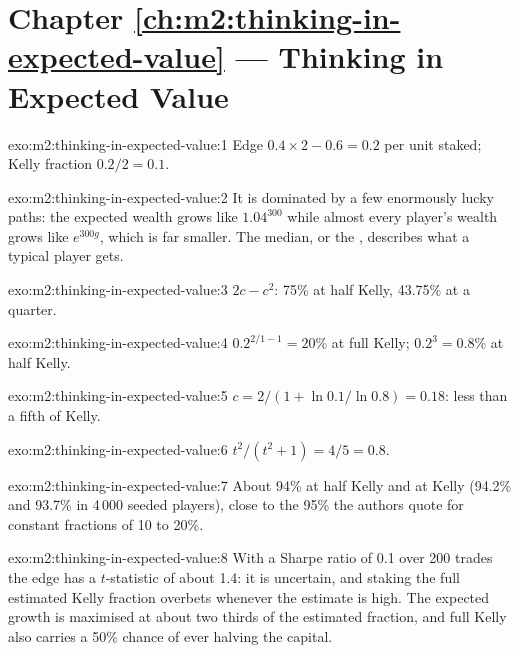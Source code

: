 \section*{Chapter \ref{ch:m2:thinking-in-expected-value} --- Thinking in Expected Value}

\begin{solution}{exo:m2:thinking-in-expected-value:1}
Edge $0.4 \times 2 - 0.6 = 0.2$ per unit staked; Kelly fraction $0.2/2 = 0.1$.
\end{solution}

\begin{solution}{exo:m2:thinking-in-expected-value:2}
It is dominated by a few enormously lucky paths: the expected wealth grows like $1.04^{300}$
while almost every player's wealth grows like $e^{300g}$, which is far smaller. The median,
or the , describes what a typical player gets.
\end{solution}

\begin{solution}{exo:m2:thinking-in-expected-value:3}
$2c - c^2$: 75\% at half Kelly, 43.75\% at a quarter.
\end{solution}

\begin{solution}{exo:m2:thinking-in-expected-value:4}
$0.2^{2/1 - 1} = 20\%$ at full Kelly; $0.2^{3} = 0.8\%$ at half Kelly.
\end{solution}

\begin{solution}{exo:m2:thinking-in-expected-value:5}
$c = 2/(1 + \ln 0.1/\ln 0.8) = 0.18$: less than a fifth of Kelly.
\end{solution}

\begin{solution}{exo:m2:thinking-in-expected-value:6}
$t^2/(t^2 + 1) = 4/5 = 0.8$.
\end{solution}

\begin{solution}{exo:m2:thinking-in-expected-value:7}
About 94\% at half Kelly and at Kelly (94.2\% and 93.7\% in 4\,000 seeded players), close to
the 95\% the authors quote for constant fractions of 10 to 20\%.
\end{solution}

\begin{solution}{exo:m2:thinking-in-expected-value:8}
With a Sharpe ratio of 0.1 over 200 trades the edge has a $t$-statistic of about 1.4: it is
uncertain, and staking the full estimated Kelly fraction overbets whenever the estimate is
high. The expected growth is maximised at about two thirds of the estimated fraction,
and full Kelly also carries a 50\% chance of ever halving the capital.
\end{solution}

